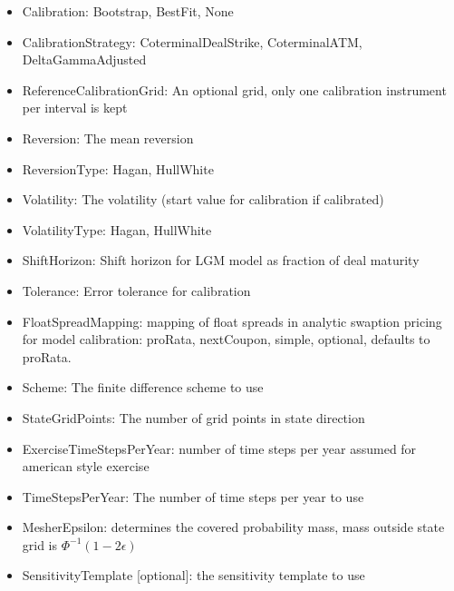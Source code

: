\begin{itemize}
\item Calibration: Bootstrap, BestFit, None
\item CalibrationStrategy: CoterminalDealStrike, CoterminalATM, DeltaGammaAdjusted
\item ReferenceCalibrationGrid: An optional grid, only one calibration instrument per interval is kept
\item Reversion: The mean reversion
\item ReversionType: Hagan, HullWhite
\item Volatility: The volatility (start value for calibration if calibrated)
\item VolatilityType: Hagan, HullWhite
\item ShiftHorizon: Shift horizon for LGM model as fraction of deal maturity
\item Tolerance: Error tolerance for calibration
\item FloatSpreadMapping: mapping of float spreads in analytic swaption pricing for model calibration: proRata,
  nextCoupon, simple, optional, defaults to proRata.
\item Scheme: The finite difference scheme to use
\item StateGridPoints: The number of grid points in state direction
\item ExerciseTimeStepsPerYear: number of time steps per year assumed for american style exercise
\item TimeStepsPerYear: The number of time steps per year to use
\item MesherEpsilon: determines the covered probability mass, mass outside state grid is $\Phi^{-1}(1-2\epsilon)$
\item SensitivityTemplate [optional]: the sensitivity template to use
\end{itemize}

